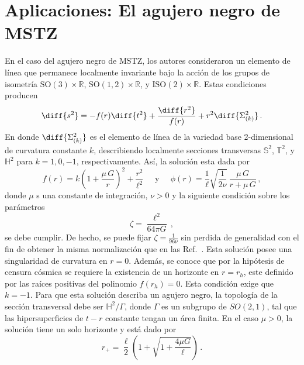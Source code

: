 \documentclass[../Main.tex]{subfiles}
\begin{document}
\section{Aplicaciones: El agujero negro de MSTZ}
En el caso del agujero negro de MSTZ, los autores consideraron un elemento de línea que permanece localmente invariante bajo la acción de los grupos de isometría $\mbox{SO}(3)\times\mathbb{R}$, $\mbox{SO}(1,2)\times\mathbb{R}$, y $\mbox{ISO}(2)\times\mathbb{R}$. Estas condiciones producen 
\begin{equation}\label{ansatz}
    \diff{s^2} = -f(r)\diff{t^2} + \frac{\diff{r^2}}{f(r)} + r^2\diff{\Sigma_{(k)}^2} \,.
\end{equation}
En donde $\diff{\Sigma_{(k)}^2}$ es el elemento de línea de la variedad base 2-dimensional de curvatura constante $k$, describiendo localmente secciones transversas $\mathbb{S}^2$, $\mathbb{T}^2$, y $\mathbb{H}^2$ para $k=1,0,-1$, respectivamente. Así, la solución esta dada por~\cite{Martinez:2002ru,Martinez:2005di}
\begin{equation}\label{MTZ}
    f(r) = k\left(1+\frac{\mu\,G}{r}\right)^2 + \frac{r^2}{\ell^2} \;\;\;\;\; \mbox{y} \;\;\;\;\; \phi(r) = \frac{1}{\ell}\sqrt{\frac{1}{2\nu}}\,\frac{\mu\,G}{r+\mu\,G}\,,
\end{equation}
donde $\mu$ s una constante de integración, $\nu >0$ y la siguiente condición sobre los parámetros
\begin{equation}
    \zeta = \frac{\ell^2}{64\pi G}\,,
\end{equation}
se debe cumplir. De hecho, se puede fijar $\zeta=\tfrac{1}{96\nu}$ sin perdida de generalidad con el fin de obtener la misma normalización que en las Ref.~\cite{Martinez:2002ru,Martinez:2005di}. Esta solución posee una singularidad de curvatura en $r=0$. Además, se conoce que por la hipótesis de censura cósmica se requiere la existencia de un horizonte en $r=r_{h}$, este definido por las raíces positivas del polinomio $f(r_{h})=0$. Esta condición exige que $k=-1$. Para que esta solución describa un agujero negro, la topología de la sección transversal debe ser $\mathbb{H}^2/\Gamma$, donde $\Gamma$ es un subgrupo de $SO(2,1)$, tal que las hipersuperficies de $t-r$ constante tengan un área finita. En el caso $\mu>0$, la solución tiene un solo horizonte y está dado por
\begin{equation}
    r_+ = \frac{\ell}{2}\left(1+\sqrt{1+\frac{4\mu G}{\ell}} \right)\,.
\end{equation}
\end{document}
